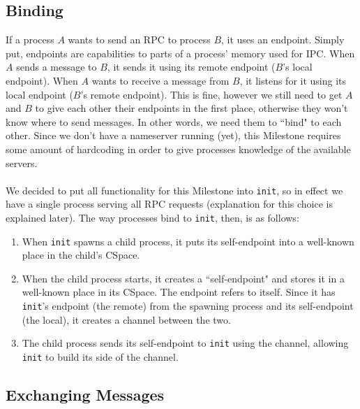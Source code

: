 \subsection{Binding}
If a process $A$ wants to send an RPC to process $B$, it uses an endpoint. Simply put, endpoints are capabilities to parts of a process' memory used for IPC. When $A$ sends a message to $B$, it sends it using its remote endpoint ($B$'s local endpoint). When $A$ wants to receive a message from $B$, it listens for it using its local endpoint ($B$'s remote endpoint). This is fine, however we still need to get $A$ and $B$ to give each other their endpoints in the first place, otherwise they won't know where to send messages. In other words, we need them to ``bind" to each other. Since we don't have a nameserver running (yet), this Milestone requires some amount of hardcoding in order to give processes knowledge of the available servers.
\\\\
We decided to put all functionality for this Milestone into \texttt{init}, so in effect we have a single process serving all RPC requests (explanation for this choice is explained later). The way processes bind to \texttt{init}, then, is as follows:
\begin{enumerate}[itemsep=0pt]
    \item When \texttt{init} spawns a child process, it puts its self-endpoint into a well-known place in the child's CSpace.
    \item When the child process starts, it creates a ``self-endpoint" and stores it in a well-known place in its CSpace. The endpoint refers to itself. Since it has \texttt{init}'s endpoint (the remote)  from the spawning process and its self-endpoint (the local), it creates a channel between the two.
    \item The child process sends its self-endpoint to \texttt{init} using the channel, allowing \texttt{init} to build its side of the channel.
\end{enumerate}

\subsection{Exchanging Messages}
